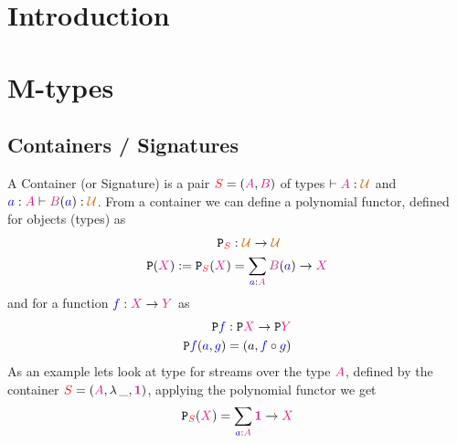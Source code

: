 \documentclass[twoside,11pt,openright]{report}
\newcommand*{\term}[1]{\textcolor{blue!80!black}{#1}}
\newcommand*{\type}[1]{\textcolor{magenta!90!black}{#1}}
\newcommand*{\dependenttype}[1]{\textcolor{magenta!70!black}{#1}}
\newcommand*{\container}[1]{\textcolor{red}{#1}}
\newcommand*{\universe}[1]{\textcolor{orange!80!black}{#1}}
\newcommand*{\unit}{\type{\textbf{1}}}
\newcommand*{\functor}[1]{\ensuremath{\mathbf{\mathtt{#1}}}}
\begin{document}
\chapter{Introduction}
\label{ch:intro}




\chapter{M-types}
\label{ch:m-types}

\section{Containers / Signatures}
A Container (or Signature) is a pair \(\container{S} = (\type{A},\type{B})\) of types \(\vdash \type{A} : \universe{\mathcal{U}}\) and \(\term{a} : \type{A} \vdash \dependenttype{B}(\term{a}) : \universe{\mathcal{U}}\). From a container we can define a polynomial functor, defined for objects (types) as
\begin{equation}
  \begin{aligned}
    \functor{P}_{\container{S}} &: \universe{\mathcal{U}} \rightarrow \universe{\mathcal{U}} \\
    \functor{P}(\type{X}) := \functor{P}_{\container{S}}(\type{X}) &= \sum_{\term{a} : \type{A}} \dependenttype{B}(\term{a}) \rightarrow \type{X}
  \end{aligned}
\end{equation}
and for a function \(\term{f} : \type{X} \rightarrow \type{Y}\) as
\begin{equation}
  \begin{aligned}
    \functor{P}\term{f} &: \functor{P}\type{X} \rightarrow \functor{P}\type{Y} \\
    \functor{P}\term{f}(\term{a},\term{g}) &= (a, \term{f} \circ \term{g})
  \end{aligned}
\end{equation}
As an example lets look at type for streams over the type \(\type{A}\), defined by the container \(\container{S} = (\type{A},\lambda\,\_, \unit)\), applying the polynomial functor we get
\begin{equation}
  \functor{P}_{\container{S}}(\type{X}) = \sum_{\term{a} : \type{A}} \unit \rightarrow \type{X}
\end{equation}
\end{document}
